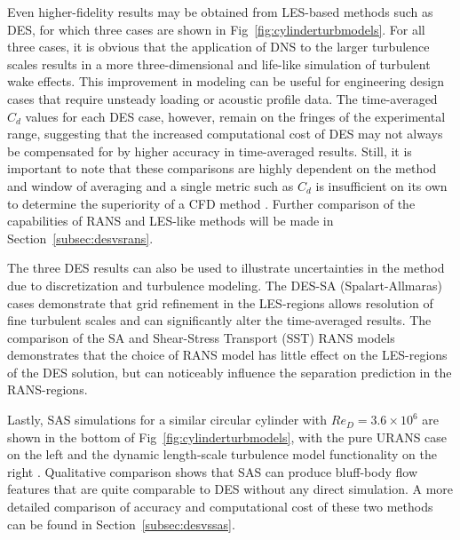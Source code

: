 \documentclass[journal]{new-aiaa}
\begin{document}
Even higher-fidelity results may be obtained from LES-based methods such as DES, for which three cases are shown in Fig~\ref{fig:cylinderturbmodels}. For all three cases, it is obvious that the application of DNS to the larger turbulence scales results in a more three-dimensional and life-like simulation of turbulent wake effects. This improvement in modeling can be useful for engineering design cases that require unsteady loading or acoustic profile data. The time-averaged $C_d$ values for each DES case, however, remain on the fringes of the experimental range, suggesting that the increased computational cost of DES may not always be compensated for by higher accuracy in time-averaged results. Still, it is important to note that these comparisons are highly dependent on the method and window of averaging and a single metric such as $C_d$ is insufficient on its own to determine the superiority of a CFD method \cite{travin2000detachededdy}. Further comparison of the capabilities of RANS and LES-like methods will be made in Section~\ref{subsec:desvsrans}.

The three DES results can also be used to illustrate uncertainties in the method due to discretization and turbulence modeling. The DES-SA (Spalart-Allmaras) cases demonstrate that grid refinement in the LES-regions allows resolution of fine turbulent scales and can significantly alter the time-averaged results. The comparison of the SA and Shear-Stress Transport (SST) RANS models demonstrates that the choice of RANS model has little effect on the LES-regions of the DES solution, but can noticeably influence the separation prediction in the RANS-regions.

Lastly, SAS simulations for a similar circular cylinder with $Re_D=3.6 \times 10^6$ are shown in the bottom of Fig~\ref{fig:cylinderturbmodels}, with the pure URANS case on the left and the dynamic length-scale turbulence model functionality on the right \cite{menter2005scaleadaptive}. Qualitative comparison shows that SAS can produce bluff-body flow features that are quite comparable to DES without any direct simulation. A more detailed comparison of accuracy and computational cost of these two methods can be found in Section~\ref{subsec:desvssas}.
\end{document}

